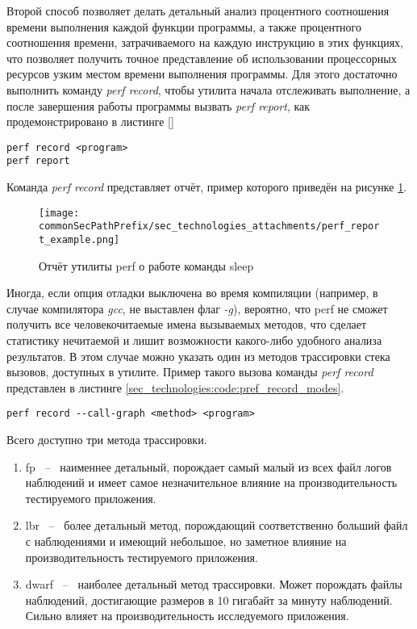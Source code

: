 Второй способ позволяет делать детальный анализ процентного соотношения времени выполнения каждой функции программы, 
а также процентного соотношения времени, затрачиваемого на каждую инструкцию в этих функциях, что позволяет 
получить точное представление об использовании процессорных ресурсов узким местом времени выполнения программы. Для этого
достаточно выполнить команду \textit{perf record}, чтобы утилита начала отслеживать выполнение, а после завершения работы программы
вызвать \textit{perf report}, как продемонстрировано в листинге \ref{}

\begin{lstlisting}[style=CodeListing, label=sec_tech:code:perf_record_report, caption={Пример использования команд perf record и perf report}]
perf record <program>
perf report
\end{lstlisting}

Команда \textit{perf record} представляет отчёт, пример которого приведён на рисунке \ref{sec_technologies:fig:perf_report_example}.
\begin{figure}[ht]
    \centering
    \texttt{[image: \\commonSecPathPrefix/sec\_technologies\_attachments/perf\_report\_example.png]}
    \caption{Отчёт утилиты perf о работе команды sleep}
    \label{sec_technologies:fig:perf_report_example}
\end{figure}

Иногда, если опция отладки выключена во время компиляции (например, в случае компилятора \textit{gcc}, не выставлен флаг \textit{-g}),
вероятно, что perf не сможет получить все человекочитаемые имена вызываемых методов, что сделает статистику 
нечитаемой и лишит возможности какого-либо удобного анализа результатов. 
В этом случае можно указать один из методов трассировки стека вызовов, доступных в утилите.
Пример такого вызова команды \textit{perf record} представлен в листинге \ref{sec_technologies:code:pref_record_modes}.

\begin{lstlisting}[style=CodeListing, label=sec_technologies:code:pref_record_modes, caption={Вызов команды perf record с указанием метода трассировки стека вызовов}]
perf record --call-graph <method> <program>
\end{lstlisting}

Всего доступно три метода трассировки.
\begin{enumerate}
    \item fp ~--~ наименнее детальный, порождает самый малый из всех файл логов наблюдений и имеет самое незначительное влияние на производительность тестируемого приложения.
    \item lbr ~--~ более детальный метод, порождающий соответственно больший файл с наблюдениями и имеющий небольшое, но заметное влияние на производительность тестируемого приложения.
    \item dwarf ~--~ наиболее детальный метод трассировки. Может порождать файлы наблюдений, достигающие размеров в 10 гигабайт за минуту наблюдений. Сильно влияет на производительность исследуемого приложения.
\end{enumerate}

